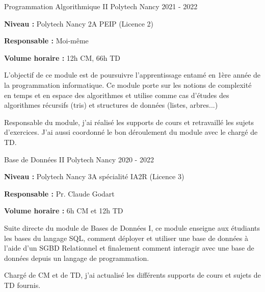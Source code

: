\documentclass[12pt, a4paper]{awesome-cv}
\begin{document}
\begin{cventries}
  \cventry
  {Programmation Algorithmique II}
  {Polytech Nancy}
  {}
  {2021 - 2022}
  {
    \begin{cvitems}
      \item {\textbf{Niveau : } Polytech Nancy 2A PEIP (Licence 2)}
      \item {\textbf{Responsable : } Moi-même}
      \item {\textbf{Volume horaire : } 12h CM, 66h TD}
    \end{cvitems}
  }

  \begin{cvparagraph}
    L'objectif de ce module est de poursuivre l'apprentissage entamé en 1ère année de la programmation informatique.
    Ce module porte sur les notions de complexité en temps et en espace des algorithmes et utilise comme cas d'études des algorithmes récursifs (tris) et structures de données (listes, arbres...)
  \end{cvparagraph}

  \begin{cvparagraph}
    Responsable du module, j'ai réalisé les supports de cours et retravaillé les sujets d'exercices.
    J'ai aussi coordonné le bon déroulement du module avec le chargé de TD.
  \end{cvparagraph}

  \cventry
  {Base de Données II}
  {Polytech Nancy}
  {}
  {2020 - 2022}
  {
    \begin{cvitems}
      \item {\textbf{Niveau : } Polytech Nancy 3A spécialité IA2R (Licence 3)}
      \item {\textbf{Responsable : } Pr. Claude Godart}
      \item {\textbf{Volume horaire : } 6h CM et 12h TD}
    \end{cvitems}
  }

  \begin{cvparagraph}
    Suite directe du module de Bases de Données I, ce module enseigne aux étudiants les bases du langage SQL, comment déployer et utiliser une base de données à l'aide d'un SGBD Relationnel et finalement comment interagir avec une base de données depuis un langage de programmation.
  \end{cvparagraph}

  \begin{cvparagraph}
    Chargé de CM et de TD, j'ai actualisé les différents supports de cours et sujets de TD fournis.
  \end{cvparagraph}


\end{cventries}
\end{document}
